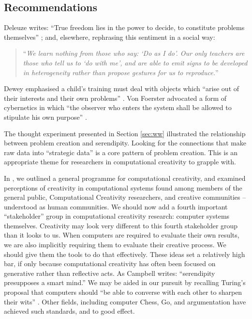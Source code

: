 \subsection{Recommendations} \label{sec:recommendations}

Deleuze writes: ``True freedom lies in the power to decide, to
constitute problems themselves'' \cite[p. 15]{deleuze1991bergsonism};
and, elsewhere, rephrasing this sentiment in a social way:
\begin{quote}
``\emph{We learn nothing from those who say: `Do as I do'. Our only teachers
  are those who tell us to `do with me', and are able to emit signs to
  be developed in heterogeneity rather than propose gestures for us to
  reproduce.}''~\cite[p. 26]{deleuze1994difference}
\end{quote}
Dewey emphasised a child's training must
deal  with objects which ``arise out of their interests and their
own problems'' \cite[p. 73]{dewey-by-mead}.  Von Foerster advocated a form of cybernetics in which ``the observer who enters the system
shall be allowed to stipulate his own purpose''
\cite[p. 286]{von2003essays}.

The thought experiment presented in Section \ref{sec:ww} illustrated
the relationship between problem creation and serendipity.  Looking
for the connections that make raw data into ``strategic data'' is a
core pattern of problem creation.  This is an appropriate theme for
researchers in computational creativity to grapple with.

In \cite{stakeholder-groups-bookchapter}, we outlined a general
programme for computational creativity, and examined perceptions of
creativity in computational systems found among members of the general
public, Computational Creativity researchers, and creative communities
-- understood as human communities.  We should now add a fourth
important ``stakeholder'' group in computational creativity research:
computer systems themselves.  Creativity may look very different to
this fourth stakeholder group than it looks to us.  When computers are
required to evaluate their own results, we are also implicitly
requiring them to evaluate their creative process.  We should give
them the tools to do that effectively.
%
These ideas set a relatively high bar, if only because computational
creativity has often been focused on generative rather than reflective
acts.  As Campbell \citeyear{campbell} writes: ``serendipity
presupposes a smart mind.''  We may be aided in our pursuit by
recalling Turing's proposal that computers should ``be able to
converse with each other to sharpen their wits''
\cite{turing-intelligent}.  Other fields, including computer Chess,
Go, and argumentation have achieved such standards, and to good effect.

